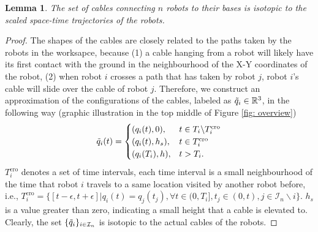 \documentclass[conference]{IEEEtran}
\newtheorem{lem}[thm]{Lemma}
\newcommand*{\myset}[1]{\mathcal{#1}} %
\newcommand*{\rthree}{\mathbb{R}^3}
\newcommand*{\height}{h}
\newcommand*{\robpath}{q} %
\newcommand*{\timet}{T} %
\newcommand*{\sptime}{\xi} %
\newcommand*{\smallheight}{\height_s} %
\newcommand*{\pathfloor}{\Tilde{\robpath}} %
\newcommand*{\tcross}{\timet^{\text{cro}}_i}
\newcommand*{\smallv}{\epsilon}
\begin{document}
\begin{lem}\label{lm: isotopy}
The set of cables connecting $n$ robots to their bases is isotopic to the scaled space-time trajectories of the robots.
\end{lem}
\begin{proof}
The shapes of the cables are closely related to the paths taken by the robots in the worksapce, because (1) a cable hanging from a robot will likely have its first contact with the ground in the neighbourhood of the X-Y coordinates of the robot, (2) when robot $i$ crosses a path that has taken by robot $j$, robot $i$'s cable will slide over the cable of robot $j$.
Therefore, we construct an approximation of the configurations of the cables, labeled as $\pathfloor_i\in\rthree$, in the following way (graphic illustration in the top middle of Figure \ref{fig: overview})
\begin{align}
    \pathfloor_i(t) = 
    \begin{cases}
        (\robpath_i(t),0),& t\in\timet_i\backslash\tcross\\
        (\robpath_i(t),\smallheight), & t\in\tcross\\
        (\robpath_i(\timet_i),\height), &t>\timet_i.
    \end{cases}    
\end{align}
$\tcross$ denotes a set of time intervals, each time interval is a small neighbourhood of the time that robot $i$ travels to a same location visited by another robot before, i.e.,
$\tcross=\{[t-\smallv, t+\smallv]|\robpath_i(t)=\robpath_j(t_j),\forall t\in(0,\timet_i], t_j\in(0,t), j\in\myset{I}_n\backslash i\}$.
$\smallheight$ is a value greater than zero, indicating a small height that a cable is elevated to. 
Clearly, the set $\{\pathfloor_i\}_{i\in\myset{I}_n}$ is isotopic to the actual cables of the robots. 

\end{proof}
\end{document}
